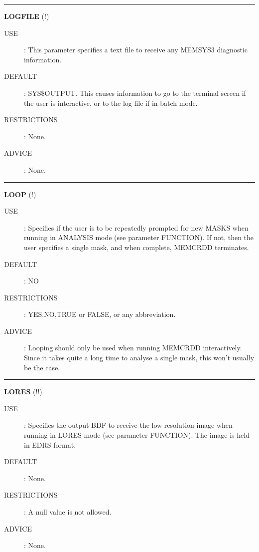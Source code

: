 \rule{\textwidth}{0.3mm}
{\Large {\bf LOGFILE} (!)}
\begin{description}
\item [USE]:
This parameter specifies a text file to receive any MEMSYS3 diagnostic 
information.
\item [DEFAULT]:
SYS\$OUTPUT. This causes information to go to the terminal screen if the user
is interactive, or to the log file if in batch mode.
\item [RESTRICTIONS]:
None.
\item [ADVICE]:
None.
\end {description}

\rule{\textwidth}{0.3mm}
{\Large {\bf LOOP} (!)}
\begin{description}
\item [USE]:
Specifies if the user is to be repeatedly prompted for new MASKS when running in 
ANALYSIS mode (see parameter FUNCTION). If not, then the user specifies a single
mask, and when complete, MEMCRDD terminates.
\item [DEFAULT]:
NO
\item [RESTRICTIONS]:
YES,NO,TRUE or FALSE, or any abbreviation.
\item [ADVICE]:
Looping should only be used when running MEMCRDD interactively. Since it 
takes quite a long time to analyse a single mask, this won't usually be the case.
\end {description}

\rule{\textwidth}{0.3mm}
{\Large {\bf LORES} (!!)}
\begin{description}
\item [USE]:
Specifies the output BDF to receive the low resolution image when running in 
LORES mode (see parameter FUNCTION). The image is held in EDRS format.
\item [DEFAULT]:
None.
\item [RESTRICTIONS]:
A null value is not allowed.
\item [ADVICE]:
None.
\end {description}

